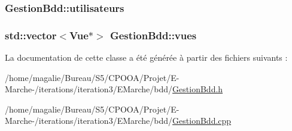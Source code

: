 \hypertarget{class_gestion_bdd_a43b0bcad5d1eb6ff51c78ceb6cdd972c}{
\subsubsection[{utilisateurs}]{ Gestion\-Bdd\-::utilisateurs\hspace{0.3cm}{\ttfamily [protected]}}}\label{class_gestion_bdd_a43b0bcad5d1eb6ff51c78ceb6cdd972c}
\hypertarget{class_gestion_bdd_a44ea1efd29c4996b1dcba0bf428051a7}{
\subsubsection[{vues}]{\setlength{\rightskip}{0pt plus 5cm}std\-::vector$<${\bf Vue}$\ast$$>$ Gestion\-Bdd\-::vues\hspace{0.3cm}{\ttfamily [protected]}}}\label{class_gestion_bdd_a44ea1efd29c4996b1dcba0bf428051a7}


La documentation de cette classe a été générée à partir des fichiers suivants \-:\begin{DoxyCompactItemize}
\item 
/home/magalie/\-Bureau/\-S5/\-C\-P\-O\-O\-A/\-Projet/\-E-\/\-Marche-\//iterations/iteration3/\-E\-Marche/bdd/\hyperlink{_gestion_bdd_8h}{Gestion\-Bdd.\-h}\item 
/home/magalie/\-Bureau/\-S5/\-C\-P\-O\-O\-A/\-Projet/\-E-\/\-Marche-\//iterations/iteration3/\-E\-Marche/bdd/\hyperlink{_gestion_bdd_8cpp}{Gestion\-Bdd.\-cpp}\end{DoxyCompactItemize}
